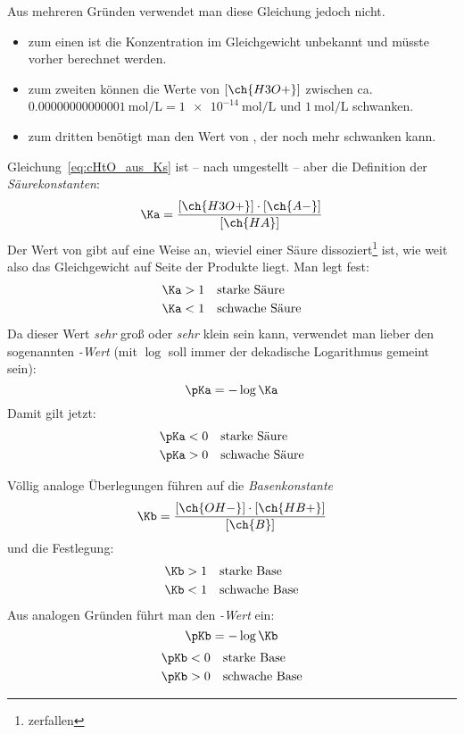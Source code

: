 \documentclass{arbeitsblatt}
\begin{document}
Aus mehreren Gründen verwendet man diese Gleichung jedoch nicht.
\begin{itemize}
  \item zum einen ist die Konzentration im Gleichgewicht unbekannt und müsste
    vorher berechnet werden.
  \item zum zweiten können die Werte von $[\ch{H3O+}]$ zwischen
    ca. $\SI{0.00000000000001}{\mole\per\liter} = \SI{1e-14}{\mole\per\liter}$ und
    $\SI{1}{\mole\per\liter}$ schwanken.
  \item zum dritten benötigt man den Wert von \Ka, der noch mehr schwanken
    kann.
\end{itemize}
Gleichung~\eqref{eq:cHtO_aus_Ks} ist -- nach \Ka umgestellt -- aber die
Definition der \emph{Säurekonstanten}:
\begin{equation}
  \Ka = \frac{ [\ch{H3O+}] \cdot [\ch{A-}] }{ [\ch{HA}] } \label{eq:Ks_definition}
\end{equation}
Der Wert von \Ka gibt auf eine Weise an, wieviel einer Säure
dissoziert\footnote{zerfallen} ist, wie weit also das Gleichgewicht auf Seite
der Produkte liegt.  Man legt fest:
\begin{align*}
  \Ka &>1 \quad\text{starke Säure} \\
  \Ka &<1 \quad\text{schwache Säure}
\end{align*}
Da dieser Wert \emph{sehr} groß oder \emph{sehr} klein sein kann, verwendet
man lieber den sogenannten \emph{\pKa-Wert} (mit $\log$ soll immer der
dekadische Logarithmus gemeint sein):
\begin{equation}
  \pKa = -\log\Ka
\end{equation}
Damit gilt jetzt:
\begin{align*}
  \pKa &<0 \quad\text{starke Säure} \\
  \pKa &>0 \quad\text{schwache Säure}
\end{align*}

Völlig analoge Überlegungen führen auf die \emph{Basenkonstante}
\begin{equation}
  \Kb = \frac{ [\ch{OH-}] \cdot [\ch{HB+}] }{ [\ch{B}] } \label{eq:Kb_definition}
\end{equation}
und die Festlegung:
\begin{align*}
  \Kb &>1 \quad\text{starke Base} \\
  \Kb &<1 \quad\text{schwache Base}
\end{align*}
Aus analogen Gründen führt man den \emph{\pKb-Wert} ein:
\begin{equation}
  \pKb = -\log\Kb
\end{equation}
\begin{align*}
  \pKb &<0 \quad\text{starke Base} \\
  \pKb &>0 \quad\text{schwache Base}
\end{align*}
\end{document}
